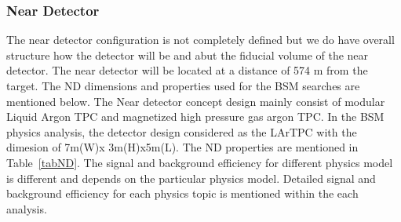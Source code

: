\subsubsection{Near Detector}
The near detector configuration is not completely defined but we do have overall structure how the detector will be and abut the fiducial volume of the near detector. The near detector will be located at a distance of 574 m from the target. The ND dimensions and properties used for the BSM searches are mentioned below.
The Near detector concept design mainly consist of modular Liquid Argon TPC and magnetized high pressure gas argon TPC. In the BSM physics analysis, the detector design considered as the LArTPC with the dimesion of 7m(W)x 3m(H)x5m(L). The ND properties are mentioned in Table~\ref{tabND}. The signal and background efficiency for different physics model is different and depends on the particular physics model. Detailed signal and background efficiency for each physics topic is mentioned within the each analysis.

\begin{table}[h]
    \begin{center}
        \end{center}
        \caption{\label{tabND}ND properties used for the analysis }
    \end{table} 
